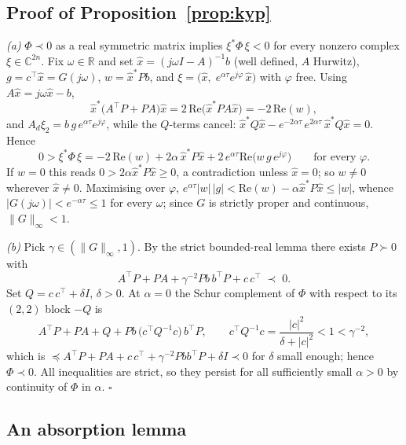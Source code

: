 \documentclass[preprint,12pt]{elsarticle}
\begin{document}
\subsection{Proof of Proposition~\ref{prop:kyp}}

\emph{(a)}  $\Phi \prec 0$ as a real symmetric matrix implies
$\xi^* \Phi\, \xi < 0$ for every nonzero complex $\xi \in
\mathbb{C}^{2n}$.  Fix $\omega \in \mathbb{R}$ and set
$\hat x = (j\omega I - A)^{-1} b$ (well defined, $A$ Hurwitz),
$g = c^{\!\top}\hat x = G(j\omega)$, $w = \hat x^* P b$, and
$\xi = \big(\hat x,\; e^{\alpha\tau} e^{j\varphi}\, \hat x\big)$ with
$\varphi$ free.  Using $A \hat x = j\omega \hat x - b$,
\[
\hat x^{*}\big(A^{\!\top} P + P A\big)\hat x
= 2\,\mathrm{Re}\big(\hat x^{*} P A \hat x\big)
= -2\,\mathrm{Re}(w),
\]
and $A_d \xi_2 = b\, g\, e^{\alpha\tau} e^{j\varphi}$, while the
$Q$-terms cancel:
$\hat x^{*} Q \hat x - e^{-2\alpha\tau}\, e^{2\alpha\tau}\,
\hat x^{*} Q \hat x = 0$.  Hence
\[
0 > \xi^{*} \Phi\, \xi
= -2\,\mathrm{Re}(w) + 2\alpha\, \hat x^{*} P \hat x
+ 2\, e^{\alpha\tau} \mathrm{Re}\big(w\, g\, e^{j\varphi}\big)
\qquad \text{for every } \varphi .
\]
If $w = 0$ this reads $0 > 2\alpha \hat x^* P \hat x \ge 0$, a
contradiction unless $\hat x = 0$; so $w \neq 0$ wherever
$\hat x \neq 0$.  Maximising over $\varphi$,
$e^{\alpha\tau} |w|\, |g| < \mathrm{Re}(w) - \alpha \hat x^* P \hat x
\le |w|$, whence $|G(j\omega)| < e^{-\alpha\tau} \le 1$ for every
$\omega$; since $G$ is strictly proper and continuous,
$\|G\|_\infty < 1$.

\emph{(b)}  Pick $\gamma \in (\|G\|_\infty, 1)$.  By the strict
bounded-real lemma \cite{Zhou1996} there exists $P \succ 0$ with
\[
A^{\!\top} P + P A + \gamma^{-2} P b\, b^{\!\top} P
+ c\, c^{\!\top} \;\prec\; 0 .
\]
Set $Q = c\,c^{\!\top} + \delta I$, $\delta > 0$.  At $\alpha = 0$
the Schur complement of $\Phi$ with respect to its $(2,2)$ block
$-Q$ is
\[
A^{\!\top} P + P A + Q
+ P b \,\big(c^{\!\top} Q^{-1} c\big)\, b^{\!\top} P ,
\qquad
c^{\!\top} Q^{-1} c = \frac{|c|^2}{\delta + |c|^2} < 1 < \gamma^{-2},
\]
which is
$\preceq A^{\!\top}P + PA + c\,c^{\!\top} + \gamma^{-2} P b b^{\!\top}
P + \delta I \prec 0$ for $\delta$ small enough; hence
$\Phi \prec 0$.  All inequalities are strict, so they persist for all
sufficiently small $\alpha > 0$ by continuity of
$\Phi$ in $\alpha$. \hfill$\square$

\subsection{An absorption lemma}
\end{document}
